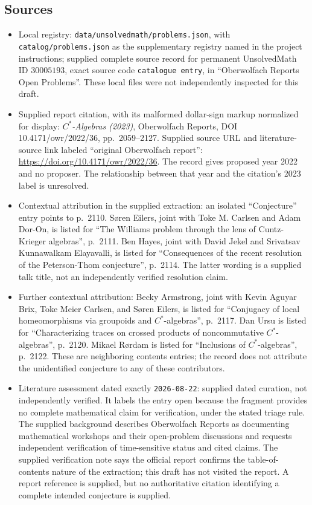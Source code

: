 \documentclass[11pt]{article}
\begin{document}
\subsection{Sources}
\begin{itemize}
\item Local registry: \texttt{data/unsolvedmath/problems.json}, with \texttt{catalog/problems.json} as the supplementary registry named in the project instructions; supplied complete source record for permanent UnsolvedMath ID \(30005193\), exact source code \texttt{catalogue entry}, in ``Oberwolfach Reports Open Problems''. These local files were not independently inspected for this draft.
\item Supplied report citation, with its malformed dollar-sign markup normalized for display: \emph{\(C^*\)-Algebras (2023)}, Oberwolfach Reports, DOI 10.4171/owr/2022/36, pp.\ 2059--2127. Supplied source URL and literature-source link labeled ``original Oberwolfach report'': \url{https://doi.org/10.4171/owr/2022/36}. The record gives proposed year 2022 and no proposer. The relationship between that year and the citation's 2023 label is unresolved.
\item Contextual attribution in the supplied extraction: an isolated ``Conjecture'' entry points to p.\ 2110. Søren Eilers, joint with Toke M. Carlsen and Adam Dor-On, is listed for ``The Williams problem through the lens of Cuntz-Krieger algebras'', p.\ 2111. Ben Hayes, joint with David Jekel and Srivatsav Kunnawalkam Elayavalli, is listed for ``Consequences of the recent resolution of the Peterson-Thom conjecture'', p.\ 2114. The latter wording is a supplied talk title, not an independently verified resolution claim.
\item Further contextual attribution: Becky Armstrong, joint with Kevin Aguyar Brix, Toke Meier Carlsen, and Søren Eilers, is listed for ``Conjugacy of local homeomorphisms via groupoids and \(C^*\)-algebras'', p.\ 2117. Dan Ursu is listed for ``Characterizing traces on crossed products of noncommutative \(C^*\)-algebras'', p.\ 2120. Mikael Rørdam is listed for ``Inclusions of \(C^*\)-algebras'', p.\ 2122. These are neighboring contents entries; the record does not attribute the unidentified conjecture to any of these contributors.
\item Literature assessment dated exactly \texttt{2026-08-22}: supplied dated curation, not independently verified. It labels the entry open because the fragment provides no complete mathematical claim for verification, under the stated triage rule. The supplied background describes Oberwolfach Reports as documenting mathematical workshops and their open-problem discussions and requests independent verification of time-sensitive status and cited claims. The supplied verification note says the official report confirms the table-of-contents nature of the extraction; this draft has not visited the report. A report reference is supplied, but no authoritative citation identifying a complete intended conjecture is supplied.
\end{itemize}
\end{document}
